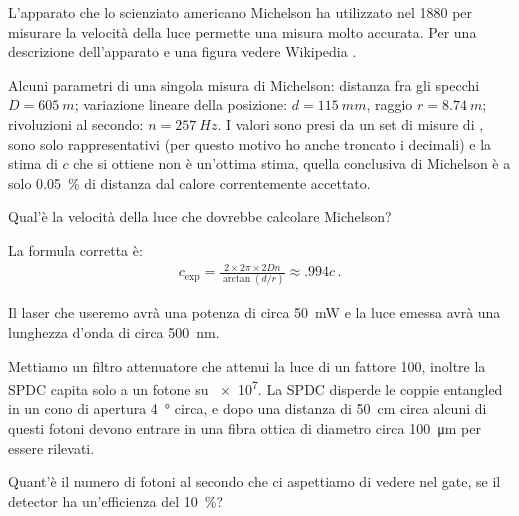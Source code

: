 \documentclass[a4paper,12pt]{article}
\begin{document}
\begin{exo}


L'apparato che lo scienziato americano Michelson ha utilizzato nel 1880 \cite[]{michelsonExperimentalDeterminationVelocity1880} per misurare la velocità della luce permette una misura molto accurata.
Per una descrizione dell'apparato e una figura vedere Wikipedia \cite[figura 3]{wikipediacontributorsFizeauFoucaultApparatus2019}.

Alcuni parametri di una singola misura di Michelson: distanza fra gli specchi \(D = \SI{605}{m}\); variazione lineare della posizione: \(d = \SI{115}{mm}\), raggio \(r = \SI{8.74}{m}\); rivoluzioni al secondo: \(n = \SI{257}{Hz}\). I valori sono presi da un set di misure di \textcite[]{michelsonExperimentalDeterminationVelocity1880}, sono solo rappresentativi (per questo motivo ho anche troncato i decimali) e la stima di \(c\) che si ottiene non è un'ottima stima, quella conclusiva di Michelson è a solo \SI{.05}{\percent} di distanza dal calore correntemente accettato.

Qual'è la velocità della luce che dovrebbe calcolare Michelson?
\end{exo}

La formula corretta è: 
%
\begin{align}
c _{\text{exp}} = \frac{2 \times 2 \pi \times 2 D n}{\arctan(d / r)} \approx \num{.994} c
\,.
\end{align}

\begin{exo}
Il laser che useremo avrà una potenza di circa \SI{50}{mW} e la luce emessa avrà una lunghezza d'onda di circa \SI{500}{nm}. 

Mettiamo un filtro attenuatore che attenui la luce di un fattore 100, inoltre la SPDC capita solo a un fotone su \num{e7}.
La SPDC disperde le coppie entangled in un cono di apertura \SI{4}{\degree} circa, e dopo una distanza di \SI{50}{cm} circa alcuni di questi fotoni devono entrare in una fibra ottica di diametro circa \SI{100}{\micro m} per essere rilevati. 

Quant'è il numero di fotoni al secondo che ci aspettiamo di vedere nel gate, se il detector ha un'efficienza del \SI{10}{\percent}?
\end{exo}
\end{document}
